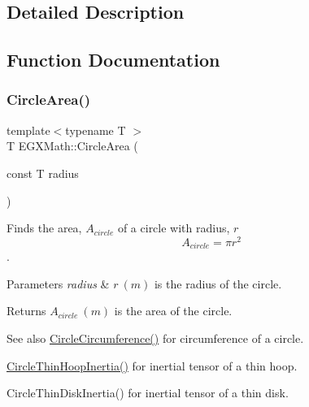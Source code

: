 \subsection{Detailed Description}


\subsection{Function Documentation}
\mbox{\label{group___e_g_x_math-_geometry-2_d-_circle_gabf5aadec991cc2bbf9d74fd83c46f40d}} 
\subsubsection{\texorpdfstring{Circle\+Area()}{CircleArea()}}
{\footnotesize\ttfamily template$<$typename T $>$ \\
T E\+G\+X\+Math\+::\+Circle\+Area (\begin{DoxyParamCaption}\item[{const T}]{radius }\end{DoxyParamCaption})}



Finds the area, $A_{circle}$ of a circle with radius, $r$ \[ A_{circle}=\pi r^2 \]. 


\begin{DoxyParams}{Parameters}
{\em radius} & $ r\ (m)$ is the radius of the circle. \\
\hline
\end{DoxyParams}
\begin{DoxyReturn}{Returns}
$ A_{circle}\ (m)$ is the area of the circle. 
\end{DoxyReturn}
\begin{DoxySeeAlso}{See also}
\mbox{\hyperlink{group___e_g_x_math-_geometry-2_d-_circle_gadb55695b75a06a3f3534494eb767e18e}{Circle\+Circumference()}} for circumference of a circle. 

\mbox{\hyperlink{group___e_g_x_math-_geometry-2_d-_circle_ga902bfe249e733c8d2917600cc4a3392b}{Circle\+Thin\+Hoop\+Inertia()}} for inertial tensor of a thin hoop. 

Circle\+Thin\+Disk\+Inertia() for inertial tensor of a thin disk. 
\end{DoxySeeAlso}
\mbox{\label{group___e_g_x_math-_geometry-2_d-_circle_gadb55695b75a06a3f3534494eb767e18e}} 
